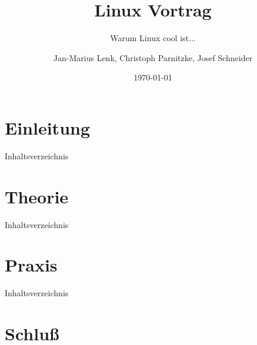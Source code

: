 \documentclass[12pt,utf8]{beamer}
\title{Linux Vortrag}
\subtitle{Warum Linux cool ist...}
\author[J.-M. Lenk, C. Parnitzke, J. Schneider]{Jan-Marius Lenk, Christoph Parnitzke, Josef Schneider}
\institute[FOSS AG - FbI]{Free and Open Source Software AG\\ Fachbereich Informatik}
\date{\today}
\begin{document}
\begin{frame}
	\titlepage
\end{frame}

\section{Einleitung}

\begin{frame}{Inhaltsverzeichnis}
\end{frame}




\section{Theorie}

\begin{frame}{Inhaltsverzeichnis}
\end{frame}




\section{Praxis}

\begin{frame}{Inhaltsverzeichnis}
\end{frame}




\section{Schluß}



\end{document}
